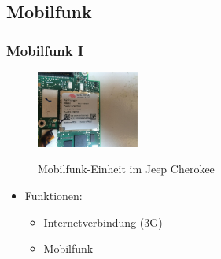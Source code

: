 \documentclass[t]{beamer}
\begin{document}
\subsection{Mobilfunk}
\begin{frame}
	\frametitle{Mobilfunk I}
    \begin{center}
        \begin{figure}
            \includegraphics[width=0.3\textwidth]{pic/001_cellular.jpg}
            \caption[Mobilfunk]{Mobilfunk-Einheit im Jeep Cherokee}
            \cite{Quelle}
        \end{figure}
	\end{center}

    \begin{itemize}
		\item Funktionen:
        \begin{itemize}
        	\item Internetverbindung (3G) %
            \item Mobilfunk %
        \end{itemize}
    \end{itemize}
\end{frame}
\end{document}
